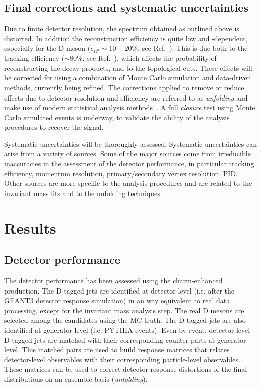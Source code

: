 \documentclass[a4paper]{jpconf}
\begin{document}
\subsection{Final corrections and systematic uncertainties}
Due to finite detector resolution, the spectrum obtained as outlined above is distorted. In addition the reconstruction efficiency is quite low
and \pT-dependent, especially for the D meson ($\epsilon_{D^0} \sim 10-20\%$, see Ref.~\cite{ALICE:2012d}). This is due both to the tracking efficiency ($\sim 80\%$, see Ref.~\cite{ALICE:2014b}),
which affects the probability of reconstructing the decay products, and to the topological cuts. These effects will be corrected for using a combination of Monte Carlo simulation and data-driven methods, currently being refined.
The corrections applied to remove or reduce effects due to detector resolution and efficiency are referred to as \emph{unfolding} and make use of modern statistical analysis methods~\cite{Hocker:1995, Dagostini:1995}.
A full \emph{closure} test using Monte Carlo simulated events is underway, to validate the ability of the analysis procedures to recover the signal.

Systematic uncertainties will be thoroughly assessed. Systematic uncertainties can arise from a variety of sources.
Some of the major sources come from irreducible inaccuracies in the assessment of the detector performance, in particular tracking efficiency, 
momentum resolution, primary/secondary vertex resolution, PID.
Other sources are more specific to the analysis procedures and are related to the invariant mass fits and to the unfolding techniques.

\section{Results}

\subsection{Detector performance}
The detector performance has been assessed using the charm-enhanced production. The D-tagged jets are identified at detector-level (i.e. after the GEANT3 detector response simulation)
in an way equivalent to real data processing, except for the invariant mass analysis step. The real D mesons are selected among the candidates using the MC truth.
The D-tagged jets are also identified at generator-level (i.e. PYTHIA events). Even-by-event, detector-level D-tagged jets are matched with their corresponding counter-parts at generator-level.
This matched pairs are used to build response matrices that relates detector-level observables with their corresponding particle-level observables. These matrices can be used
to correct detector-response distortions of the final distributions on an ensemble basis (\emph{unfolding}).
\end{document}
